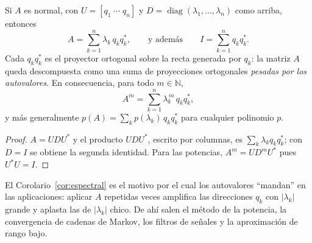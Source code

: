 \begin{corollary}\label{cor:espectral}   %
Si $A$ es normal, con $U=[q_1\;\cdots\;q_n]$ y $D=\operatorname{diag}(\lambda_1,\dots,\lambda_n)$
como arriba, entonces
\[
A=\sum_{k=1}^{n}\lambda_k\, q_k q_k^{*},
\qquad\text{y además}\qquad
I=\sum_{k=1}^{n} q_k q_k^{*}.
\]
Cada $q_kq_k^{*}$ es el proyector ortogonal sobre la recta generada por $q_k$:
la matriz $A$ queda descompuesta como una suma de proyecciones ortogonales
\emph{pesadas por los autovalores}. En consecuencia, para todo $m\in\mathbb{N}$,
\[
A^{m}=\sum_{k=1}^{n}\lambda_k^{\,m}\, q_k q_k^{*},
\]
y más generalmente $p(A)=\sum_k p(\lambda_k)\,q_kq_k^{*}$ para cualquier polinomio $p$.
\end{corollary}

\begin{proof}
$A=UDU^{*}$ y el producto $UDU^{*}$, escrito por columnas, es $\sum_k \lambda_k q_kq_k^{*}$;
con $D=I$ se obtiene la segunda identidad. Para las potencias,
$A^{m}=UD^{m}U^{*}$ pues $U^{*}U=I$.
\end{proof}

\begin{remark}   %
El Corolario~\ref{cor:espectral} es el motivo por el cual los autovalores ``mandan''
en las aplicaciones: aplicar $A$ repetidas veces amplifica las direcciones $q_k$ con
$|\lambda_k|$ grande y aplasta las de $|\lambda_k|$ chico. De ahí salen el método
de la potencia, la convergencia de cadenas de Markov, los filtros de señales y
la aproximación de rango bajo.
\end{remark}

